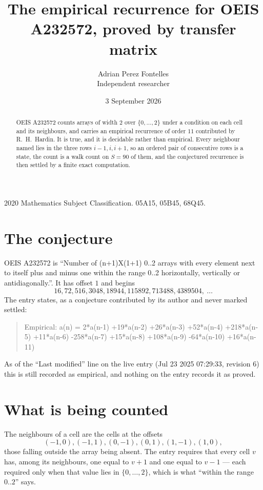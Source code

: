 \documentclass[11pt,a4paper]{article}
\title{The empirical recurrence for OEIS A232572, proved by transfer matrix}
\author{Adrian Perez Fontelles\\ \small Independent researcher}
\date{3 September 2026}
\theoremstyle{plain}
\theoremstyle{definition}
\begin{document}
\maketitle

\begin{abstract}
OEIS A232572 counts arrays of width $2$ over $\{0,\dots,2\}$ under a condition on each cell
and its neighbours, and carries an empirical recurrence of order $11$ contributed by
R.~H.~Hardin. It is true, and it is decidable rather than empirical. Every neighbour named lies
in the three rows $i-1,i,i+1$, so an ordered pair of consecutive rows is a state, the count is
a walk count on $S=90$ of them, and the conjectured recurrence is then settled by a finite
exact computation.
\end{abstract}

\noindent\small 2020 Mathematics Subject Classification. 05A15, 05B45, 68Q45.\normalsize

\section{The conjecture}

OEIS A232572 is ``Number of (n+1)X(1+1) 0..2 arrays with every element next to itself plus and minus one within the range 0..2 horizontally, vertically or antidiagonally.''. It has offset $1$ and begins
\[
16, 72, 516, 3048, 18944, 115892, 713488, 4389504,\ \dots
\]
The entry states, as a conjecture contributed by its author and never marked settled:
\begin{quote}
Empirical: a(n) = 2*a(n-1) +19*a(n-2) +26*a(n-3) +52*a(n-4) +218*a(n-5) +11*a(n-6) -258*a(n-7) +15*a(n-8) +108*a(n-9) -64*a(n-10) +16*a(n-11)
\end{quote}
As of the ``Last modified'' line on the live entry (Jul 23 2025 07:29:33, revision 6) this is still
recorded as empirical, and nothing on the entry records it as proved.

\section{What is being counted}

The neighbours of a cell are the cells at the offsets
\[
(-1,0), (-1,1), (0,-1), (0,1), (1,-1), (1,0),
\]
those falling outside the array being absent. The entry requires that every cell $v$ has, among its neighbours, one equal to $v+1$ and one equal to $v-1$ --- each required only when that value lies in $\{0,\dots,2\}$, which is what ``within the range $0..2$'' says.
\end{document}

